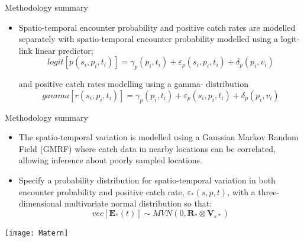 \documentclass[xcolor=x11names,compress]{beamer}
\renewcommand{\(}{\begin{columns}}
\renewcommand{\)}{\end{columns}}
\newcommand{\<}[1]{\begin{column}{#1}}
\renewcommand{\>}{\end{column}}
\begin{document}
\begin{frame}{Methodology summary}
	\begin{itemize}
	\setlength\itemsep{2em}
	\small

	\item Spatio-temporal encounter probability and positive catch rates
		are modelled separately with spatio-temporal encounter
		probability modelled using a logit-link linear predictor;
		\begin{equation}
			logit[p(s_{i},p_{i},t_{i})] = \gamma_{p}(p_{i},t_{i}) +
			\varepsilon_{p}(s_{i},p_{i},t_{i}) + \delta_{p}(p_{i},
			v_{i})
		\end{equation}

		and positive catch rates modelling using a gamma- distribution
		\begin{equation}
			gamma[r(s_{i},p_{i},t_{i})] = \gamma_{p}(p_{i},t_{i}) +
			\varepsilon_{p}(s_{i},p_{i},t_{i}) + \delta_{p}(p_{i},
			v_{i})
		\end{equation}

\end{itemize}

\end{frame}

\begin{frame}{Methodology summary}
	\begin{itemize}
	\setlength\itemsep{2em}
	\small

	\item The spatio-temporal variation is modelled using a Gaussian
		Markov Random Field (GMRF) where catch data in nearby locations
		can be correlated, allowing inference about poorly sampled
		locations. 
	\item Specify a probability distribution for spatio-temporal
		variation in both encounter probability and positive catch rate, 
		$\varepsilon_{*}(s,p,t)$, with a three-dimensional multivariate 
		normal distribution so that:
		\begin{equation}
			vec[\mathbf{E}_{*}(t)] \sim MVN(0,\mathbf{R}_{*} \otimes
			\mathbf{V}_{{\varepsilon}{*}})
		\end{equation}
	\end{itemize}
	\centering
	\texttt{[image: Matern]}

\end{frame}
\end{document}
